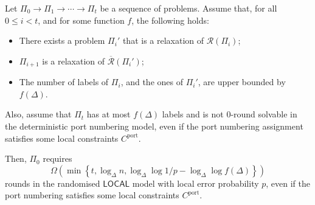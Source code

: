 \documentclass[letterpaper,11pt]{article}
\newcommand{\1}{\mathbb I}
\newcommand{\LOCAL}{\ensuremath{\mathsf{LOCAL}}\xspace}
\begin{document}
\begin{theorem}
\label{thm:sevenOne}
Let $\Pi_0 \rightarrow \Pi_1 \rightarrow \cdots \rightarrow \Pi_t$ be a sequence of problems.
Assume that, for all $0 \le i < t$, and for some function $f$, the following holds:
%
\begin{itemize}
    \item There exists a problem $\Pi_i'$ that is a relaxation of $\mathcal{R}(\Pi_i)$;

    \item $\Pi_{i+1}$ is a relaxation of $\overline{\mathcal{R}}(\Pi_i')$;

    \item The number of labels of $\Pi_i$, and the ones of $\Pi_i'$, are upper bounded by $f(\Delta)$.
\end{itemize}
%
Also, assume that $\Pi_t$ has at most $f(\Delta)$ labels and is not $0$-round solvable in the deterministic port numbering model, even if the port numbering assignment satisfies some local constraints $C^{\mathrm{port}}$.

Then, $\Pi_0$ requires
\[
\Omega\left(\min\left\{t,\log_{\Delta}n, \log_{\Delta}\log 1/p-\log_{\Delta}\log f(\Delta)\right\}\right)
\]
rounds in the randomised \LOCAL model with local error probability $p$, even if the port numbering satisfies some local constraints $C^{\mathrm{port}}$.
\end{theorem}
\end{document}
